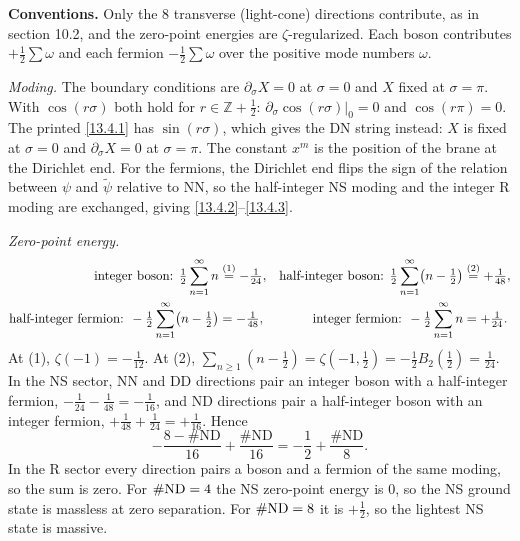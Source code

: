 \begin{tcolorbox}[breakable]
	\begin{remark}
		\textbf{Conventions.} Only the 8 transverse (light-cone) directions contribute, as in section 10.2, and the zero-point energies are $\zeta$-regularized. Each boson contributes $+\frac12\sum\omega$ and each fermion $-\frac12\sum\omega$ over the positive mode numbers $\omega$.

		\textit{Moding.} The boundary conditions are $\partial_\sigma X=0$ at $\sigma=0$ and $X$ fixed at $\sigma=\pi$. With $\cos(r\sigma)$ both hold for $r\in\mathbb Z+\frac12$: $\partial_\sigma\cos(r\sigma)|_0=0$ and $\cos(r\pi)=0$. The printed \eqref{13.4.1} has $\sin(r\sigma)$, which gives the DN string instead: $X$ is fixed at $\sigma=0$ and $\partial_\sigma X=0$ at $\sigma=\pi$. The constant $x^m$ is the position of the brane at the Dirichlet end. For the fermions, the Dirichlet end flips the sign of the relation between $\psi$ and $\tilde\psi$ relative to NN, so the half-integer NS moding and the integer R moding are exchanged, giving \eqref{13.4.2}--\eqref{13.4.3}.

		\textit{Zero-point energy.}
		\begin{align*}
			\text{integer boson: } \tfrac12\sum_{n=1}^\infty n &\overset{(1)}{=} -\tfrac1{24}, &
			\text{half-integer boson: } \tfrac12\sum_{n=1}^\infty\bigl(n-\tfrac12\bigr) &\overset{(2)}{=} +\tfrac1{48},\\
			\text{half-integer fermion: } -\tfrac12\sum_{n=1}^\infty\bigl(n-\tfrac12\bigr) &= -\tfrac1{48}, &
			\text{integer fermion: } -\tfrac12\sum_{n=1}^\infty n &= +\tfrac1{24}.
		\end{align*}
		At (1), $\zeta(-1)=-\frac1{12}$. At (2), $\sum_{n\ge1}(n-\frac12)=\zeta(-1,\tfrac12)=-\frac12B_2(\tfrac12)=\frac1{24}$. In the NS sector, NN and DD directions pair an integer boson with a half-integer fermion, $-\frac1{24}-\frac1{48}=-\frac1{16}$, and ND directions pair a half-integer boson with an integer fermion, $+\frac1{48}+\frac1{24}=+\frac1{16}$. Hence
		\begin{equation*}
			-\frac{8-\#\mathrm{ND}}{16}+\frac{\#\mathrm{ND}}{16} = -\frac12+\frac{\#\mathrm{ND}}{8} .
		\end{equation*}
		In the R sector every direction pairs a boson and a fermion of the same moding, so the sum is zero. For $\#{\rm ND}=4$ the NS zero-point energy is $0$, so the NS ground state is massless at zero separation. For $\#{\rm ND}=8$ it is $+\frac12$, so the lightest NS state is massive.
	\end{remark}
\end{tcolorbox}

